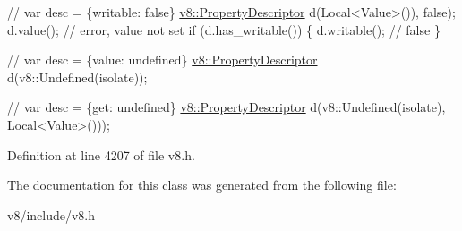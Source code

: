 \begin{DoxyCode}
\textcolor{comment}{// var desc = \{writable: false\}}
\mbox{\hyperlink{classv8_1_1PropertyDescriptor}{v8::PropertyDescriptor}} d(Local<Value>()), \textcolor{keyword}{false});
d.value(); \textcolor{comment}{// error, value not set}
\textcolor{keywordflow}{if} (d.has\_writable()) \{
  d.writable(); \textcolor{comment}{// false}
\}

\textcolor{comment}{// var desc = \{value: undefined\}}
\mbox{\hyperlink{classv8_1_1PropertyDescriptor}{v8::PropertyDescriptor}} d(v8::Undefined(isolate));

\textcolor{comment}{// var desc = \{get: undefined\}}
\mbox{\hyperlink{classv8_1_1PropertyDescriptor}{v8::PropertyDescriptor}} d(v8::Undefined(isolate), Local<Value>()));
\end{DoxyCode}
 

Definition at line 4207 of file v8.\+h.



The documentation for this class was generated from the following file\+:\begin{DoxyCompactItemize}
\item 
v8/include/v8.\+h\end{DoxyCompactItemize}
